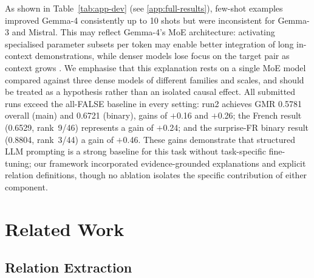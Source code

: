 \documentclass[
]{ceurart}
\theoremstyle{definition}
\begin{document}
As shown in Table~\ref{tab:app-dev} (see \ref{app:full-results}), few-shot examples improved Gemma-4 consistently up to 10 shots but were inconsistent for Gemma-3 and Mistral.
This may reflect Gemma-4's MoE architecture: activating specialised parameter subsets per token may enable better integration of long in-context demonstrations, while denser models lose focus on the target pair as context grows \citep{deepseek2024deepseekmoe,wang-etal-2024-scaling}. We emphasise that this explanation rests on a single MoE model compared against three dense models of different families and scales, and should be treated as a hypothesis rather than an isolated causal effect.
All submitted runs exceed the all-FALSE baseline in every setting: run2 achieves GMR 0.5781 overall (main) and 0.6721 (binary), gains of $+$0.16 and $+$0.26; the French result (0.6529, rank~9/46) represents a gain of $+$0.24; and the surprise-FR binary result (0.8804, rank~3/44) a gain of $+$0.46.
These gains demonstrate that structured LLM prompting is a strong baseline for this task without task-specific fine-tuning; our framework incorporated evidence-grounded explanations and explicit relation definitions, though no ablation isolates the specific contribution of either component.


\section{Related Work}\label{sec:related}

\subsection{Relation Extraction}
\end{document}
